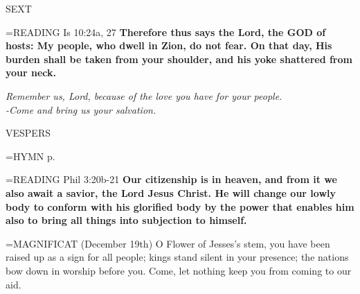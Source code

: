 \begin{flushleft}\normalsize SEXT\\\end{flushleft}

\hangindent=\parindent \small{READING} Is 10:24a, 27 \textbf{Therefore thus says the Lord, the GOD of hosts: My people, who dwell in Zion, do not fear. On that day, His burden shall be taken from your shoulder, and his yoke shattered from your neck.}

\begin{center}
\textit{Remember us, Lord, because of the love you have for your people.\\
-Come and bring us your salvation.}
\end{center}

\begin{flushleft}\normalsize VESPERS\\\end{flushleft}

\hangindent=\parindent \small{\uppercase{HYMN} p.  \pageref{advent:firstHymn}\\}

\hangindent=\parindent \small{READING} Phil 3:20b-21 \textbf{Our citizenship is in heaven, and from it we also await a savior, the Lord Jesus Christ. He will change our lowly body to conform with his glorified body by the power that enables him also to bring all things into subjection to himself.\\}

\hangindent=\parindent \small{MAGNIFICAT  (December 19th) O Flower of Jesses's stem, you have been raised up as a sign for all people; kings stand silent in your presence; the nations bow down in worship before you. Come, let nothing keep you from coming to our aid.\\}
